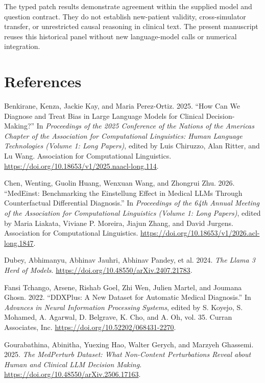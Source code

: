 \documentclass[
  english,
  11pt,
]{article}
\newlength{\cslhangindent}
\newenvironment{CSLReferences}[2] %
 {\begin{list}{}{%
  \setlength{\itemindent}{0pt}
  \setlength{\leftmargin}{0pt}
  \setlength{\parsep}{0pt}
  \ifodd #1
   \setlength{\leftmargin}{\cslhangindent}
   \setlength{\itemindent}{-1\cslhangindent}
  \fi
  \setlength{\itemsep}{#2\baselineskip}}}
 {\end{list}}
\begin{document}
The typed patch results demonstrate agreement within the supplied model
and question contract. They do not establish new-patient validity,
cross-simulator transfer, or unrestricted causal reasoning in clinical
text. The present manuscript reuses this historical panel without new
language-model calls or numerical integration.

\section*{References}\label{references}

\protect{}\label{refs}
\begin{CSLReferences}{1}{1}
Benkirane, Kenza, Jackie Kay, and Maria Perez-Ortiz. 2025. {``How Can We
Diagnose and Treat Bias in Large Language Models for Clinical
Decision-Making?''} In \emph{Proceedings of the 2025 Conference of the
Nations of the Americas Chapter of the Association for Computational
Linguistics: Human Language Technologies (Volume 1: Long Papers)},
edited by Luis Chiruzzo, Alan Ritter, and Lu Wang. Association for
Computational Linguistics.
\url{https://doi.org/10.18653/v1/2025.naacl-long.114}.

Chen, Wenting, Guolin Huang, Wenxuan Wang, and Zhongrui Zhu. 2026.
{``{M}ed{E}inst: Benchmarking the Einstellung Effect in Medical {LLM}s
Through Counterfactual Differential Diagnosis.''} In \emph{Proceedings
of the 64th Annual Meeting of the {A}ssociation for {C}omputational
{L}inguistics (Volume 1: Long Papers)}, edited by Maria Liakata, Viviane
P. Moreira, Jiajun Zhang, and David Jurgens. Association for
Computational Linguistics.
\url{https://doi.org/10.18653/v1/2026.acl-long.1847}.

Dubey, Abhimanyu, Abhinav Jauhri, Abhinav Pandey, et al. 2024. \emph{The
Llama 3 Herd of Models}.
\url{https://doi.org/10.48550/arXiv.2407.21783}.

Fansi Tchango, Arsene, Rishab Goel, Zhi Wen, Julien Martel, and Joumana
Ghosn. 2022. {``DDXPlus: A New Dataset for Automatic Medical
Diagnosis.''} In \emph{Advances in Neural Information Processing
Systems}, edited by S. Koyejo, S. Mohamed, A. Agarwal, D. Belgrave, K.
Cho, and A. Oh, vol. 35. Curran Associates, Inc.
\url{https://doi.org/10.52202/068431-2270}.

Gourabathina, Abinitha, Yuexing Hao, Walter Gerych, and Marzyeh
Ghassemi. 2025. \emph{The MedPerturb Dataset: What Non-Content
Perturbations Reveal about Human and Clinical LLM Decision Making}.
\url{https://doi.org/10.48550/arXiv.2506.17163}.


\end{CSLReferences}
\end{document}
